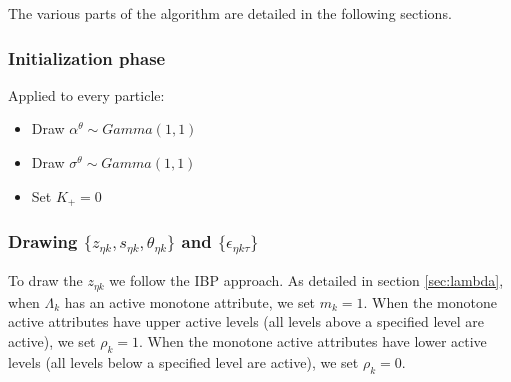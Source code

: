 \documentclass[12pt]{article}
\newcounter{thm}[section]
\begin{document}
The various parts of the algorithm are detailed in the following sections.

\subsubsection{Initialization phase}

Applied to every particle:

\begin{itemize}
	\item Draw $\alpha^\theta \sim Gamma(1,1)$
	\item Draw $\sigma^\theta \sim Gamma(1,1)$
	\item Set $K_+ = 0$
\end{itemize}

\subsubsection{Drawing $\{z_{\eta k},s_{\eta k},\theta_{\eta k}\}$ and  $\{\epsilon_{\eta k \tau}\} $}\label{sec:drawparams}
To draw the $z_{\eta k}$ we follow the IBP approach. As detailed in section \ref{sec:lambda}, when $\Lambda_k$ has an active monotone attribute, we set $m_k=1$. When the monotone active attributes have upper active levels (all levels above a specified level are active), we set $\rho_k=1$. When the monotone active attributes have lower active levels (all levels below a specified level are active), we set $\rho_k=0$.
\end{document}
